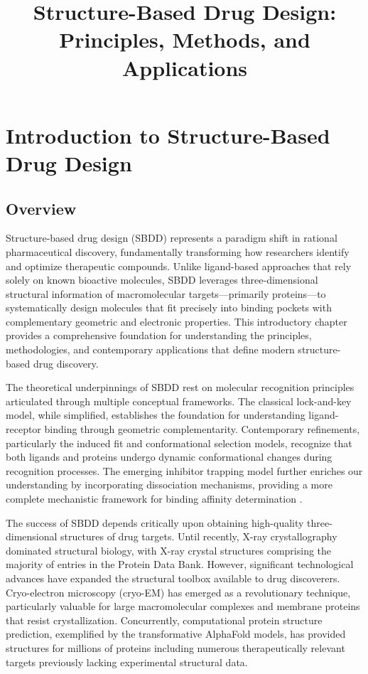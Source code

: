 \documentclass[12pt,a4paper]{article}
\title{\textbf{Structure-Based Drug Design: Principles, Methods, and Applications}}
\author{}
\date{}
\begin{document}
\chapter*{Introduction to Structure-Based Drug Design}

\section*{Overview}

Structure-based drug design (SBDD) represents a paradigm shift in rational pharmaceutical discovery, fundamentally transforming how researchers identify and optimize therapeutic compounds. Unlike ligand-based approaches that rely solely on known bioactive molecules, SBDD leverages three-dimensional structural information of macromolecular targets—primarily proteins—to systematically design molecules that fit precisely into binding pockets with complementary geometric and electronic properties. This introductory chapter provides a comprehensive foundation for understanding the principles, methodologies, and contemporary applications that define modern structure-based drug discovery.

The theoretical underpinnings of SBDD rest on molecular recognition principles articulated through multiple conceptual frameworks. The classical lock-and-key model, while simplified, establishes the foundation for understanding ligand-receptor binding through geometric complementarity. Contemporary refinements, particularly the induced fit and conformational selection models, recognize that both ligands and proteins undergo dynamic conformational changes during recognition processes. The emerging inhibitor trapping model further enriches our understanding by incorporating dissociation mechanisms, providing a more complete mechanistic framework for binding affinity determination \citep{Durrant2010,Gestwicki2011,Miao2015}.

The success of SBDD depends critically upon obtaining high-quality three-dimensional structures of drug targets. Until recently, X-ray crystallography dominated structural biology, with X-ray crystal structures comprising the majority of entries in the Protein Data Bank. However, significant technological advances have expanded the structural toolbox available to drug discoverers. Cryo-electron microscopy (cryo-EM) has emerged as a revolutionary technique, particularly valuable for large macromolecular complexes and membrane proteins that resist crystallization. Concurrently, computational protein structure prediction, exemplified by the transformative AlphaFold models, has provided structures for millions of proteins including numerous therapeutically relevant targets previously lacking experimental structural data.
\end{document}
